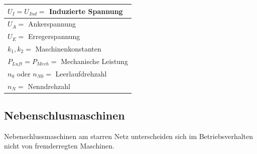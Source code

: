     \begin{minipage}{5cm}
    \begin{tabular}{|p{4cm}|}
    \hline
	$U_I = U_{Ind} =$ Induzierte Spannung \\
	\hline
	$U_A =$ Ankerspannung\\
	\hline
	$U_E =$ Erregerspannung \\
	\hline
	$k_1 , k_2 =$ Maschinenkonstanten \\
	\hline
	$P_{Luft} = P_{Mech} =$ Mechanische Leistung \\
	\hline
	$n_0$ oder $n_{N0} =$ Leerlaufdrehzahl \\
	\hline
	$n_N =$ Nenndrehzahl \\
	\hline
	
	
	\end{tabular}
	\end{minipage}
    
    	
    
    \subsection{Nebenschlusmaschinen}
    	Nebenschlussmaschinen am starren Netz unterscheiden sich im Betriebsverhalten nicht von fremderregten Maschinen.
    	

